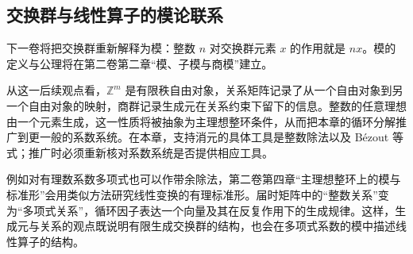 \subsection{交换群与线性算子的模论联系}
\label{b1:subsec:0904:03}

下一卷将把交换群重新解释为模：整数 \(n\) 对交换群元素 \(x\) 的作用就是 \(nx\)。模的定义与公理将在第二卷第二章“模、子模与商模”建立。

\ProseParagraphBreak
从这一后续观点看，\(\mathbb Z^m\) 是有限秩自由对象，关系矩阵记录了从一个自由对象到另一个自由对象的映射，商群记录生成元在关系约束下留下的信息。整数的任意理想由一个元素生成，这一性质将被抽象为主理想整环条件，从而把本章的循环分解推广到更一般的系数系统。在本章，支持消元的具体工具是整数除法以及 Bézout 等式；推广时必须重新核对系数系统是否提供相应工具。

\ProseParagraphBreak
例如对有理数系数多项式也可以作带余除法，第二卷第四章“主理想整环上的模与标准形”会用类似方法研究线性变换的有理标准形。届时矩阵中的“整数关系”变为“多项式关系”，循环因子表达一个向量及其在反复作用下的生成规律。这样，生成元与关系的观点既说明有限生成交换群的结构，也会在多项式系数的模中描述线性算子的结构。

